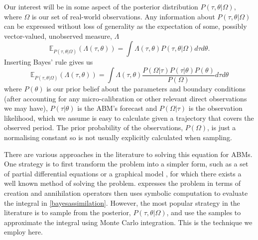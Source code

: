 \documentclass{article}
\begin{document}
Our interest will be in some aspect of the posterior distribution $P(\tau,\theta | \Omega)$, where  $\Omega$ is our set of real-world observations. Any information about $P(\tau,\theta | \Omega)$ can be expressed without loss of generality as the expectation of some, possibly vector-valued, unobserved measure, $\Lambda$
\begin{equation}
\mathbb{E}_{P(\tau,\theta|\Omega)}(\Lambda(\tau,\theta)) = \int \Lambda(\tau,\theta) P(\tau,\theta|\Omega) d\tau d\theta.
\label{expectation}
\end{equation}
Inserting Bayes' rule gives us
\begin{equation}
\mathbb{E}_{P(\tau,\theta|\Omega)}(\Lambda(\tau,\theta)) = \int \Lambda(\tau,\theta) \frac{P(\Omega|\tau)P(\tau|\theta)P(\theta)}{P(\Omega)} d\tau d\theta
\label{bayesassimilation}
\end{equation}
where $P(\theta)$ is our prior belief about the parameters and boundary conditions (after accounting for any micro-calibration or other relevant direct observations we may have), $P(\tau|\theta)$ is the ABM's forecast and $P(\Omega|\tau)$ is the observation likelihood, which we assume is easy to calculate given a trajectory that covers the observed period. The prior probability of the observations, $P(\Omega)$, is just a normalising constant so is not usually explicitly calculated when sampling.

There are various approaches in the literature to solving this equation for ABMs. One strategy is to first transform the problem into a simpler form, such as a set of partial differential equations \citep{lloyd_exploring_2016} or a graphical model \citep{liao2010integrated}, for which there exists a well known method of solving the problem. \citet{tang2019data} expresses the problem in terms of creation and annihilation operators then uses symbolic computation to evaluate the integral in \eqref{bayesassimilation}. However, the most popular strategy in the literature is to sample from the posterior, $P(\tau,\theta|\Omega)$, and use the samples to approximate the integral using Monte Carlo integration. This is the technique we employ here.
\end{document}
